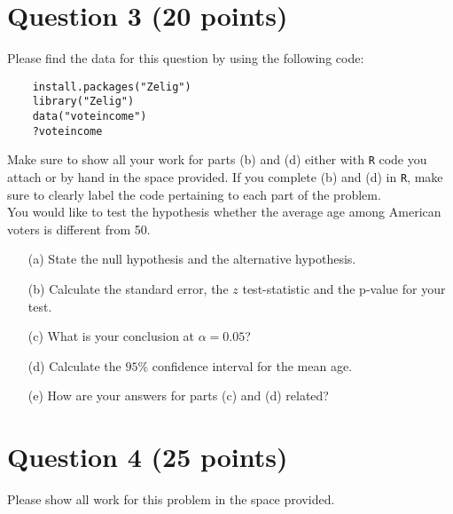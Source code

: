 \documentclass[12pt,letterpaper]{article}
\begin{document}
	
		\vspace{7em}
	\section*{Question 3 (20 points)}
	Please find the data for this question by using the following code:
	\begin{verbatim}
	install.packages("Zelig")
	library("Zelig")
	data("voteincome")
	?voteincome
	\end{verbatim} 
	
\noindent Make sure to show all your work for parts (b) and (d) either with \texttt{R} code you attach or by hand in the space provided.  If you complete (b) and (d) in \texttt{R}, make sure to clearly label the code pertaining to each part of the problem.\\
	
	
	
\noindent You would like to test the hypothesis whether the average age among American voters is different from 50. 
	
	\begin{itemize}
		\item[(a)] State the null hypothesis and the alternative hypothesis.\\

		
		\newpage
			\item[(b)] Calculate the standard error, the $z$ test-statistic and the p-value for your test.\\
		\vspace{10em}
		
		
		
			\item[(c)] What is your conclusion at $\alpha=0.05$?\\
		\vspace{10em}
		
		
		
			\item[(d)] Calculate the $95\%$ confidence interval for the mean age.\\
		\vspace{10em}
		
		
			\item[(e)] How are your answers for parts (c) and (d) related?\\
	\end{itemize}

\newpage
	
\section*{Question 4 (25 points)}
		Please show all work for this problem in the space provided.\\
\end{document}
